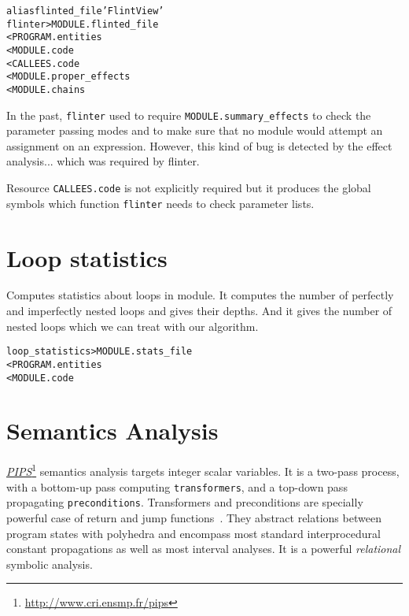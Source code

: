\documentclass[a4paper]{report}
\newenvironment{PipsMake}{\begin{alltt}}{\end{alltt}}
\newcommand{\LINK}[2]{\href{#2}{#1}\footnote{\url{#2}}\xspace}
\newcommand{\PIPS}{\LINK{\emph{PIPS}}{http://www.cri.ensmp.fr/pips}}
\begin{document}
\begin{PipsMake}
alias flinted_file 'Flint View'
flinter                         > MODULE.flinted_file
        < PROGRAM.entities
        < MODULE.code
        < CALLEES.code
        < MODULE.proper_effects
        < MODULE.chains
\end{PipsMake}

In the past, \texttt{flinter} used to require \texttt{MODULE.summary\_effects}
to check the parameter passing modes and to make sure that no module would
attempt an assignment on an expression. However, this kind of bug is
detected by the effect analysis... which was required by flinter.

Resource \texttt{CALLEES.code} is not explicitly required but it produces the
global symbols which function \texttt{flinter} needs to check parameter lists.

\section{Loop statistics}

Computes statistics about loops in module. It computes the number of
perfectly and imperfectly  nested loops and gives their depths. And it gives
the number of nested loops which we can treat with our algorithm.   

\begin{PipsMake}
loop_statistics > MODULE.stats_file
        < PROGRAM.entities
        < MODULE.code
\end{PipsMake}


\section{Semantics Analysis}
\label{subsection-semantics-analysis}

\PIPS{} semantics analysis targets integer scalar variables. It is a
two-pass process, with a bottom-up pass computing \verb+transformers+, and
a top-down pass propagating \verb+preconditions+. Transformers and
preconditions are specially powerful case of return and jump
functions~\cite{CCKT86}. They abstract relations between program states
with polyhedra and encompass most standard interprocedural constant
propagations as well as most interval analyses. It is a powerful {\em
  relational} symbolic analysis.
\end{document}
